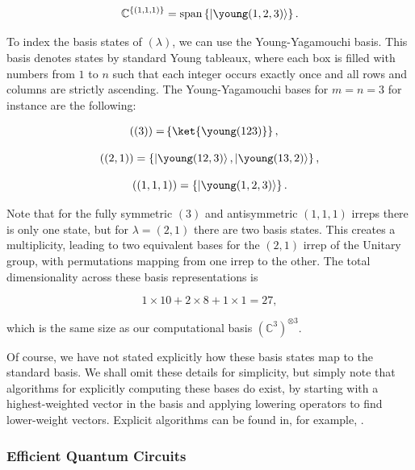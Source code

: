 \begin{equation}
\mathbb{C}^{\{(1,1,1)\}} = \textrm{span}\left\{\left|\young(1,2,3)\right\rangle\right\}.
\end{equation}

To index the basis states of $(\lambda)$, we can use the Young-Yagamouchi basis. This basis denotes states by standard Young tableaux, where each box is filled with numbers from $1$ to $n$ such that each integer occurs exactly once and all rows and columns are strictly ascending. The Young-Yagamouchi bases for $m=n=3$ for instance are the following:

\begin{align}
((3)) = &\left\{\ket{\young(123)}\right\},
\end{align}

\begin{equation}
((2,1)) = \left\{\left|\young(12,3)\right\rangle, \left|\young(13,2)\right\rangle\right\},
\end{equation}

\begin{equation}
((1,1,1)) = \left\{\left|\young(1,2,3)\right\rangle\right\}.
\end{equation}

Note that for the fully symmetric $(3)$ and antisymmetric $(1,1,1)$ irreps there is only one state, but for $\lambda = (2,1)$ there are two basis states. This creates a multiplicity, leading to two equivalent bases for the $(2,1)$ irrep of the Unitary group, with permutations mapping from one irrep to the other. The total dimensionality across these basis representations is

\begin{equation}
1\times 10+2\times 8 + 1\times 1 = 27,
\end{equation}

\noindent which is the same size as our computational basis $(\mathbb{C}^3)^{\otimes 3}$.

Of course, we have not stated explicitly how these basis states map to the standard basis. We shall omit these details for simplicity, but simply note that algorithms for explicitly computing these bases do exist, by starting with a highest-weighted vector in the basis and applying lowering operators to find lower-weight vectors. Explicit algorithms can be found in, for example, \cite{alex2011, dhand2015}.

\subsubsection{Efficient Quantum Circuits}


